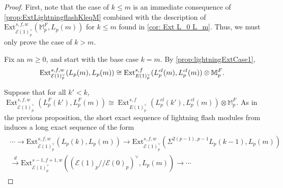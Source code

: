 \documentclass{amsart}
\theoremstyle{plain}
\numberwithin{theorem}{section}
\numberwithin{equation}{section}
\numberwithin{figure}{section}
\DeclareMathOperator{\Ext}{Ext}
\newcommand{\mF}{{\mathbb F}}
\newcommand{\mM}{{\mathbb M}}
\newcommand{\cE}{{\mathcal E}}
\newcommand{\0}{\langle 0 \rangle }
\begin{document}
\begin{proof}
    First, note that the case of $k \leq m$ is an immediate consequence of \cref{prop:ExtLightningflashKleqM} combined with the description of  $\text{Ext}_{\mathcal{E}(1)^\vee_p}^{s,f,w}(\mM_p^F, L_p(m))$ for $k \le m$ found in \cref{cor: Ext L_0 L_m}. Thus, we must only prove the case of $k>m$. 

Fix an $m \ge 0$, and start with the base case $k=m$. By \cref{prop:lightningExtCase1},
\[
\textup{Ext}_{\mathcal{E}(1)^\vee_p}^{s,f,w}(L_p(m), L_p(m)) \cong \textup{Ext}_{{E}(1)^\vee_p}^{s,f}(L^{cl}_p(m), L^{cl}_p(m)) \otimes \mM_{p}^{F}.
\]

Suppose that for all $k' < k$, $\Ext_{\cE(1)_p^\vee}^{s,f,w}(L_p^F (k'), L_p^F (m)) \cong \Ext_{E(1)_p^\vee}^{s,f}(L_p^{cl}(k'), L_p^{cl} (m)) \otimes \mM_{p}^{F}$. 
As in the previous proposition, the short exact sequence of lightning flash modules from  induces a long exact sequence of the form
\begin{align}
    \label{eq:LESLightningFlashExtKgeqM}
    \begin{split}
        \cdots \to \text{Ext}^{s,f,w}_{\mathcal{E}(1)^\vee_p}(L_p (k), L_p (m)) \to \text{Ext}^{s,f,w}_{\mathcal{E}(1)^\vee_p}(\Sigma^{2(p-1), p-1}L_p (k-1), L_p (m)) \\
        \xrightarrow{d}\text{Ext}^{s-1,f+1,w}_{\mathcal{E}(1)^\vee_p}((\mathcal{E}(1)_p//\mathcal{E}(0)_p)^\vee, L_p(m)) \to \cdots
    \end{split}
\end{align}


\end{proof}
\end{document}
